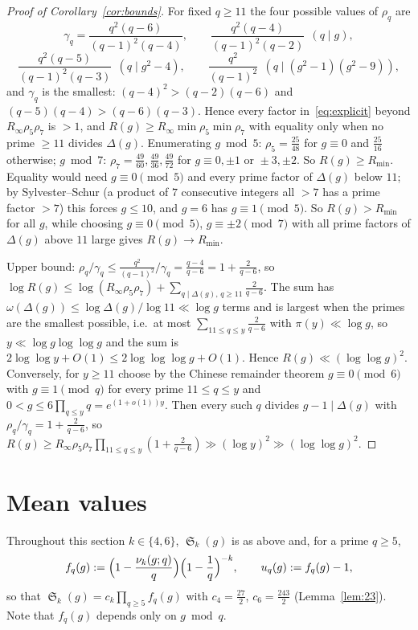 \documentclass[11pt,a4paper]{article}
\theoremstyle{plain}
\theoremstyle{definition}
\theoremstyle{remark}
\newcommand{\Rinf}{R_{\infty}}
\newcommand{\Rmin}{R_{\min}}
\DeclareMathOperator{\Sing}{\mathfrak S}
\begin{document}
\begin{proof}[Proof of Corollary~\ref{cor:bounds}]
For fixed $q\ge11$ the four possible values of $\rho_q$ are
\[
\gamma_q=\frac{q^2(q-6)}{(q-1)^2(q-4)},\qquad
\frac{q^2(q-4)}{(q-1)^2(q-2)}\ \ (q\mid g),
\]
\[
\frac{q^2(q-5)}{(q-1)^2(q-3)}\ \ (q\mid g^2-4),\qquad
\frac{q^2}{(q-1)^2}\ \ (q\mid(g^2-1)(g^2-9)),
\]
and $\gamma_q$ is the smallest: $(q-4)^2>(q-2)(q-6)$ and
$(q-5)(q-4)>(q-6)(q-3)$.  Hence every factor in~\eqref{eq:explicit} beyond
$\Rinf\rho_5\rho_7$ is $>1$, and $R(g)\ge\Rinf\min\rho_5\min\rho_7$ with
equality only when no prime $\ge11$ divides $\Delta(g)$.  Enumerating
$g\bmod5$: $\rho_5=\frac{25}{48}$ for $g\equiv0$ and $\frac{25}{16}$
otherwise; $g\bmod7$: $\rho_7=\frac{49}{60},\frac{49}{36},\frac{49}{72}$
for $g\equiv0,\pm1\text{ or }\pm3,\pm2$.  So $R(g)\ge\Rmin$.  Equality
would need $g\equiv0\pmod5$ and every prime factor of $\Delta(g)$ below
$11$; by Sylvester--Schur (a product of $7$ consecutive integers all
$>7$ has a prime factor $>7$) this forces $g\le10$, and $g=6$ has
$g\equiv1\pmod 5$.  So $R(g)>\Rmin$ for all $g$, while choosing $g\equiv0\pmod5$,
$g\equiv\pm2\pmod7$ with all prime factors of $\Delta(g)$ above $11$ large
gives $R(g)\to\Rmin$.

Upper bound: $\rho_q/\gamma_q\le\frac{q^2}{(q-1)^2}\big/\gamma_q=\frac{q-4}{q-6}=1+\frac2{q-6}$,
so $\log R(g)\le\log(\Rinf\rho_5\rho_7)+\sum_{q\mid\Delta(g),\,q\ge11}\frac{2}{q-6}$.
The sum has $\omega(\Delta(g))\le\log\Delta(g)/\log 11\ll\log g$ terms and
is largest when the primes are the smallest possible, i.e.\ at most
$\sum_{11\le q\le y}\frac2{q-6}$ with $\pi(y)\ll\log g$, so
$y\ll\log g\log\log g$ and the sum is $2\log\log y+O(1)\le 2\log\log\log g+O(1)$.
Hence $R(g)\ll(\log\log g)^2$.  Conversely, for $y\ge11$ choose by the
Chinese remainder theorem $g\equiv0\pmod6$ with $g\equiv1\pmod q$ for every
prime $11\le q\le y$ and $0<g\le6\prod_{q\le y}q=e^{(1+o(1))y}$.  Then every
such $q$ divides $g-1\mid\Delta(g)$ with $\rho_q/\gamma_q=1+\frac2{q-6}$,
so $R(g)\ge\Rinf\rho_5\rho_7\prod_{11\le q\le y}(1+\frac2{q-6})\gg(\log y)^2\gg(\log\log g)^2$.
\end{proof}

\section{Mean values}

Throughout this section $k\in\{4,6\}$, $\Sing_k(g)$ is as above and, for a
prime $q\ge5$,
\[
f_q(g):=\Bigl(1-\frac{\nu_k(g;q)}q\Bigr)\Bigl(1-\frac1q\Bigr)^{-k},\qquad u_q(g):=f_q(g)-1,
\]
so that $\Sing_k(g)=c_k\prod_{q\ge5}f_q(g)$ with $c_4=\frac{27}2$, $c_6=\frac{243}2$
(Lemma~\ref{lem:23}).  Note that $f_q(g)$ depends only on $g\bmod q$.
\end{document}

